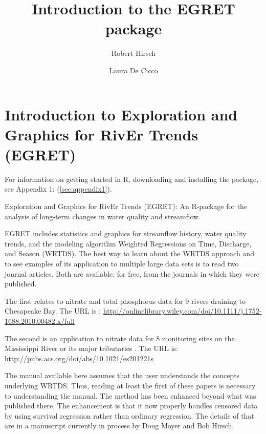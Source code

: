 \documentclass[a4paper,11pt]{article}
\begin{document}


\title{Introduction to the EGRET package}
\author[1]{Robert Hirsch}
\author[1]{Laura De Cicco}



\maketitle
\tableofcontents

\section{Introduction to Exploration and Graphics for RivEr Trends (EGRET)}

For information on getting started in R, downloading and installing the package, see Appendix 1: (\ref{sec:appendix1}).

Exploration and Graphics for RivEr Trends (EGRET): An R-package for the analysis of long-term changes in water quality and streamflow. 

EGRET includes statistics and graphics for streamflow history, water quality trends, and the modeling algorithm Weighted Regressions on Time, Discharge, and Season (WRTDS). The best way to learn about the WRTDS approach and to see examples of its application to multiple large data sets is to read two journal articles.  Both are available, for free, from the journals in which they were published.

The first relates to nitrate and total phosphorus data for 9 rivers draining to Chesapeake Bay.  The URL is \cite{HirschII}: 
\url{http://onlinelibrary.wiley.com/doi/10.1111/j.1752-1688.2010.00482.x/full}

The second is an application to nitrate data for 8 monitoring sites on the Mississippi River or its major tributaries \cite{HirschIII}.  The URL is: \url{http://pubs.acs.org/doi/abs/10.1021/es201221s}

The manual available here assumes that the user understands the concepts underlying WRTDS.  Thus, reading at least the first of these papers is necessary to understanding the manual.  The method has been enhanced beyond what was published there.  The enhancement is that it now properly handles censored data by using survival regression rather than ordinary regression.  The details of that are in a manuscript currently in process by Doug Moyer and Bob Hirsch.
\end{document}

